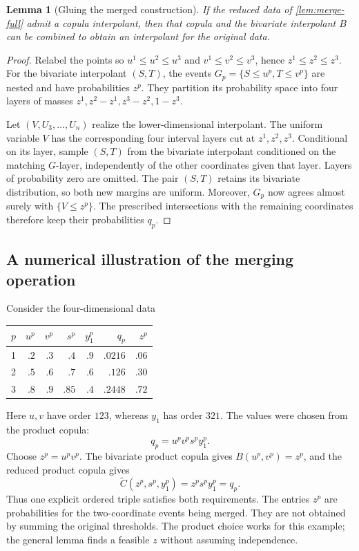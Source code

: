 \documentclass[a4paper,11pt]{amsart}
\numberwithin{equation}{section}
\newtheorem{lemma}[lemma]{Lemma}
\theoremstyle{definition}
\theoremstyle{remark}
\begin{document}
\begin{lemma}[Gluing the merged construction]\label{lem:merge-glue}
If the reduced data of \cref{lem:merge-full} admit a copula interpolant,
then that copula and the bivariate interpolant $B$ can be combined to
obtain an interpolant for the original data.
\end{lemma}
\begin{proof}
Relabel the points so $u^1\le u^2\le u^3$ and
$v^1\le v^2\le v^3$, hence $z^1\le z^2\le z^3$.
For the bivariate interpolant $(S,T)$, the events
$G_p=\{S\le u^p,T\le v^p\}$ are nested and have probabilities $z^p$.
They partition its probability space into four layers of masses
$z^1,z^2-z^1,z^3-z^2,1-z^3$.

Let $(V,U_3,\ldots,U_n)$ realize the lower-dimensional interpolant.
The uniform variable $V$ has the corresponding four interval layers
cut at $z^1,z^2,z^3$. Conditional on its layer, sample $(S,T)$ from the
bivariate interpolant conditioned on the matching $G$-layer,
independently of the other coordinates given that layer. Layers of
probability zero are omitted.
The pair $(S,T)$ retains its bivariate distribution, so both new margins
are uniform. Moreover, $G_p$ now agrees almost surely with
$\{V\le z^p\}$. The prescribed intersections with the remaining
coordinates therefore keep their probabilities $q_p$.
\end{proof}

\subsection{A numerical illustration of the merging operation}
Consider the four-dimensional data
\begin{center}
\begin{tabular}{c|rrrr|r|r}
$p$ & $u^p$ & $v^p$ & $s^p$ & $y_1^p$ & $q_p$ & $z^p$\\
\hline
1 & $.2$ & $.3$ & $.4$ & $.9$ & $.0216$ & $.06$\\
2 & $.5$ & $.6$ & $.7$ & $.6$ & $.126$ & $.30$\\
3 & $.8$ & $.9$ & $.85$ & $.4$ & $.2448$ & $.72$
\end{tabular}
\end{center}
Here $u,v$ have order $123$, whereas $y_1$ has order $321$.
The values were chosen from the product copula:
\[
q_p=u^pv^ps^py_1^p.
\]
Choose $z^p=u^pv^p$. The bivariate product copula gives
$B(u^p,v^p)=z^p$, and the reduced product copula gives
\[
 \widetilde C(z^p,s^p,y_1^p)=z^ps^py_1^p=q_p.
\]
Thus one explicit ordered triple satisfies both requirements.
The entries $z^p$ are probabilities for the two-coordinate events being
merged. They are not obtained by summing the original thresholds. The
product choice works for this example; the general lemma finds a feasible
$z$ without assuming independence.
\end{document}
